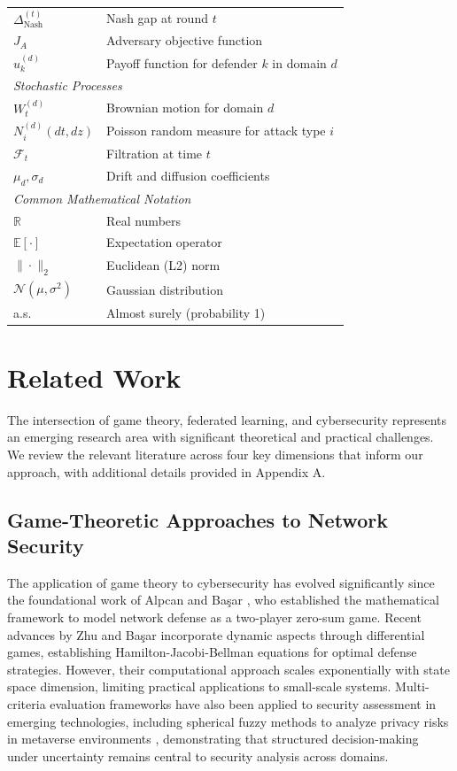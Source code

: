 \documentclass[12pt,a4paper]{article}
\theoremstyle{definition}
\begin{document}
\begin{longtable}{@{}ll@{}}
$\Delta_{\text{Nash}}^{(t)}$ & Nash gap at round $t$ \\
$J_A$ & Adversary objective function \\
$u_k^{(d)}$ & Payoff function for defender $k$ in domain $d$ \\
\midrule
\multicolumn{2}{l}{\textit{Stochastic Processes}} \\
$W_t^{(d)}$ & Brownian motion for domain $d$ \\
$N_i^{(d)}(dt, dz)$ & Poisson random measure for attack type $i$ \\
$\mathcal{F}_t$ & Filtration at time $t$ \\
$\mu_d, \sigma_d$ & Drift and diffusion coefficients \\
\midrule
\multicolumn{2}{l}{\textit{Common Mathematical Notation}} \\
$\mathbb{R}$ & Real numbers \\
$\mathbb{E}[\cdot]$ & Expectation operator \\
$\|\cdot\|_2$ & Euclidean (L2) norm \\
$\mathcal{N}(\mu, \sigma^2)$ & Gaussian distribution \\
a.s. & Almost surely (probability 1) \\
\end{longtable}
\endgroup

\section{Related Work}

The intersection of game theory, federated learning, and cybersecurity represents an emerging research area with significant theoretical and practical challenges. We review the relevant literature across four key dimensions that inform our approach, with additional details provided in Appendix A.

\subsection{Game-Theoretic Approaches to Network Security}

The application of game theory to cybersecurity has evolved significantly since the foundational work of Alpcan and Başar \cite{alpcan2011network}, who established the mathematical framework to model network defense as a two-player zero-sum game. Recent advances by Zhu and Başar \cite{zhu2015game} incorporate dynamic aspects through differential games, establishing Hamilton-Jacobi-Bellman equations for optimal defense strategies. However, their computational approach scales exponentially with state space dimension, limiting practical applications to small-scale systems. Multi-criteria evaluation frameworks have also been applied to security assessment in emerging technologies, including spherical fuzzy methods to analyze privacy risks in metaverse environments \cite{hezam2024evaluation}, demonstrating that structured decision-making under uncertainty remains central to security analysis across domains.
\end{document}
